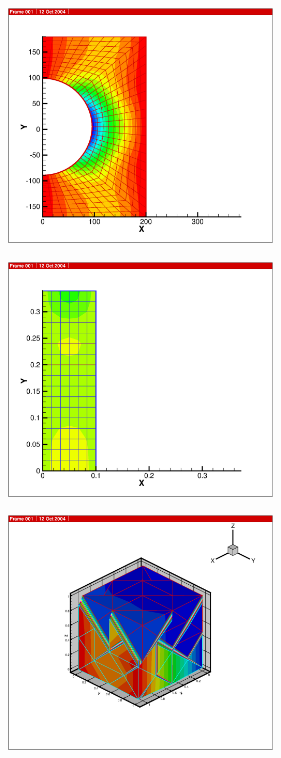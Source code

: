 {\begin{figure}[htb!]
  \includegraphics[width=7cm]{figures/m_dp_quad.eps}\\
\end{figure}

\begin{figure}[htb!]
  \includegraphics[width=7cm]{figures/m_sys_quad.eps}\\
\end{figure}

\begin{figure}[htb!]
  \includegraphics[width=7cm]{figures/m_brick.eps}\\
\end{figure}

}
